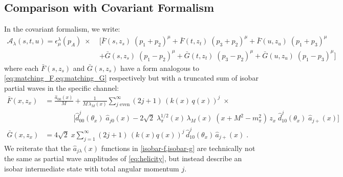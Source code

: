 \documentclass[10pt, aps,prd,amsmath,amssymb,superscriptaddress,onecolumn,
nofootinbib,showpacs,preprintnumbers]{revtex4-1}
\begin{document}
\subsection{Comparison with Covariant Formalism}
%
In the covariant formalism, we write:
  \begin{align}
    \label{eq:covariant-iso-decomp}
    \mathcal{A}_\lambda(s,t,u) = \epsilon_\mu^\lambda(p_A) \; \times \; &\bigg[
     \bar{F}(s,z_s) \; (p_1 + p_2)^\mu
     + \bar{F}(t, z_t) \; (p_3 + p_2)^\mu
      + \bar{F}(u, z_u) \; (p_1 + p_3)^\mu \nonumber \\
    &+\bar{G}(s,z_s) \; (p_1 - p_2)^\mu
    + \bar{G}(t,z_t) \; (p_3 - p_2)^\mu
    + \bar{G}(u,z_u) \; (p_1 - p_3)^\mu \bigg]
  \end{align}
where each \(\bar{F}(s,z_s)\) and \(\bar{G}(s,z_s)\) have a form analogous to \cref{eq:matching_F,eq:matching_G} respectively but with a truncated sum of isobar partial waves in the specific channel:
\begin{subequations}
  \begin{align}
      \bar{F}(x,z_x) &= \frac{\hat{a}_{00}(x)}{M} + \frac{1}{M \, \lambda_M(x)} \sum_{j \text{ even}}^\infty (2j+1) \, (k(x)\,q(x))^{j} \; \times \nonumber \\
           & \qquad \qquad \bigg[ \hat{d}^j_{00}(\theta_x) \; \hat{a}_{j0}(x)
         - 2 \sqrt{2} \; \lambda_\pi^{1/2}(x) \, \lambda_M(x) \; (x + M^2 - m_\pi^2)\,  z_x \; \hat{d}^j_{10}(\theta_x) \; \hat{a}_{j+}(x) \bigg]
      \label{isobar-f} \\
   \bar{G}(x,z_x) &=  4 \sqrt{2} \; x \sum_{j = 1}^\infty (2j+1) \, (k(x)q(x))^{j} \,\hat{d}^j_{10}(\theta_x) \, \hat{a}_{j+}(x) \; . \label{isobar-g}
  \end{align}
\end{subequations}
We reiterate that the \(\hat{a}_{j\lambda}(x)\) functions in \cref{isobar-f,isobar-g} are technically not the same as partial wave amplitudes of \cref{eq:helicity}, but instead describe an isobar intermediate state with total angular momentum \(j\).
\end{document}
